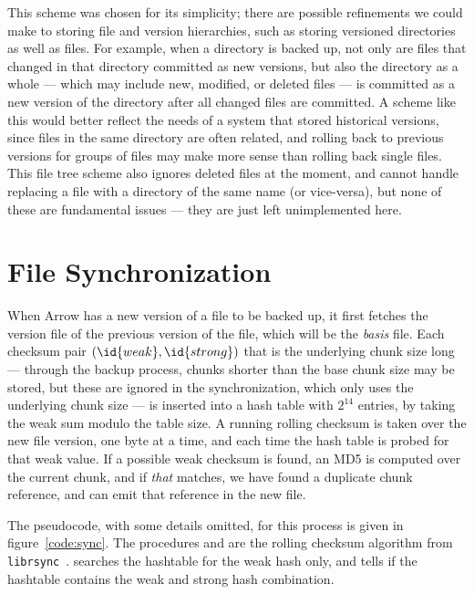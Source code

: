 \documentclass{article}
\begin{document}
This scheme was chosen for its simplicity; there are possible
refinements we could make to storing file and version hierarchies,
such as storing versioned directories as well as files. For example,
when a directory is backed up, not only are files that changed in that
directory committed as new versions, but also the directory as a whole
--- which may include new, modified, or deleted files --- is committed
as a new version of the directory after all changed files are
committed. A scheme like this would better reflect the needs of a
system that stored historical versions, since files in the same
directory are often related, and rolling back to previous versions for
groups of files may make more sense than rolling back single
files. This file tree scheme also ignores deleted files at the moment,
and cannot handle replacing a file with a directory of the same name
(or vice-versa), but none of these are fundamental issues --- they are
just left unimplemented here.

\section{File Synchronization}

When Arrow has a new version of a file to be backed up, it first
fetches the version file of the previous version of the file, which
will be the \emph{basis} file. Each checksum pair \( (\id{weak},
\id{strong} ) \) that is the underlying chunk size long --- through
the backup process, chunks shorter than the base chunk size may be
stored, but these are ignored in the synchronization, which only uses
the underlying chunk size --- is inserted into a hash table with
\(2^{14}\) entries, by taking the weak sum modulo the table size. A
running rolling checksum is taken over the new file version, one byte
at a time, and each time the hash table is probed for that weak
value. If a possible weak checksum is found, an MD5 is computed over
the current chunk, and if \emph{that} matches, we have found a
duplicate chunk reference, and can emit that reference in the new
file.

The pseudocode, with some details omitted, for this process is given
in figure~\ref{code:sync}. The procedures  and
 are the rolling checksum algorithm from
\texttt{librsync}~\cite{librsync}.  searches the
hashtable for the weak hash only, and  tells if
the hashtable contains the weak and strong hash combination.
\end{document}
